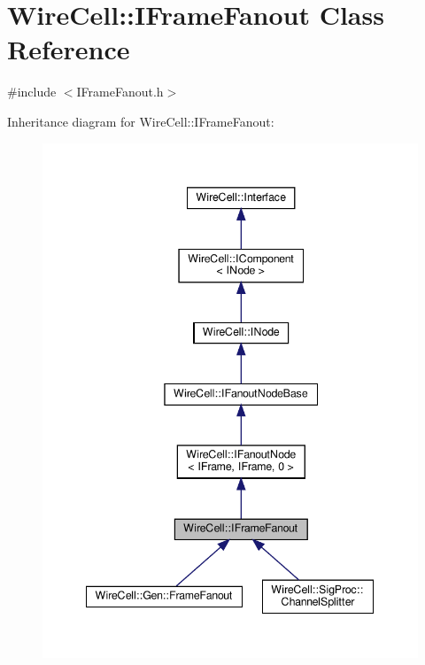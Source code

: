 \hypertarget{class_wire_cell_1_1_i_frame_fanout}{}\section{Wire\+Cell\+:\+:I\+Frame\+Fanout Class Reference}
\label{class_wire_cell_1_1_i_frame_fanout}


{\ttfamily \#include $<$I\+Frame\+Fanout.\+h$>$}



Inheritance diagram for Wire\+Cell\+:\+:I\+Frame\+Fanout\+:
\nopagebreak
\begin{figure}[H]
\begin{center}
\leavevmode
\includegraphics[width=342pt]{class_wire_cell_1_1_i_frame_fanout__inherit__graph}
\end{center}
\end{figure}


